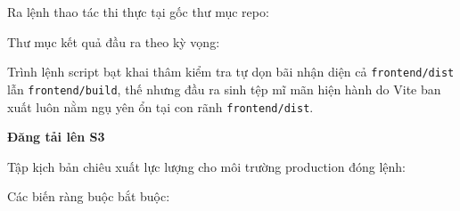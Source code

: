 Ra lệnh thao tác thi thực tại gốc thư mục repo:

\begin{Shaded}
\begin{Highlighting}[]
\OperatorTok{=}\OperatorTok{=} 
\end{Highlighting}
\end{Shaded}

Thư mục kết quả đầu ra theo kỳ vọng:

\begin{Shaded}
\begin{Highlighting}[]
\end{Highlighting}
\end{Shaded}

Trình lệnh script bạt khai thâm kiểm tra tự dọn bãi nhận diện cả
\texttt{frontend/\allowbreak{}dist} lẫn \texttt{frontend/\allowbreak{}build}, thế nhưng đầu ra
sinh tệp mĩ mãn hiện hành do Vite ban xuất luôn nằm ngụ yên ổn tại con
rãnh \texttt{frontend/\allowbreak{}dist}.

\vspace{0.5em}\noindent\textbf{Đăng tải lên S3}\par

Tập kịch bản chiêu xuất lực lượng cho môi trường production đóng lệnh:

\begin{Shaded}
\begin{Highlighting}[]
\end{Highlighting}
\end{Shaded}

Các biến ràng buộc bắt buộc:

